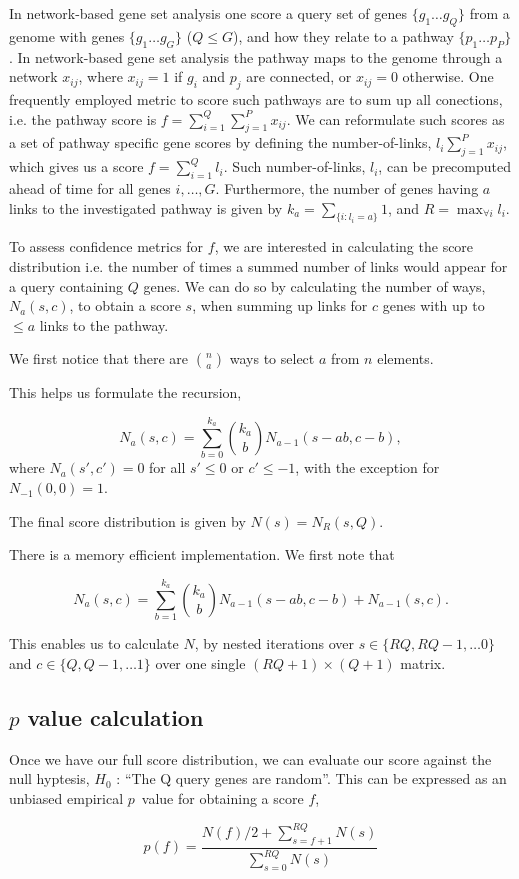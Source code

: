 \documentclass[11pt]{article}
\begin{document}
In network-based gene set analysis one score a query set of genes $ \{g_1 \ldots g_Q\} $ from a genome with genes $\{g_1 \ldots g_G\}$ ($Q \le G$), and how they relate to a pathway $\{p_1 \ldots p_P\}$. In network-based gene set analysis the pathway maps to the genome through a network ${x_{ij}}$, where $x_{ij}=1$ if $g_i$ and $p_j$ are connected, or $x_{ij}=0$ otherwise. One frequently employed metric to score such pathways are to sum up all conections, i.e. the pathway score is $f=\sum_{i=1}^Q\sum_{j=1}^P x_{ij}$.
We can reformulate such scores as a set of pathway specific gene scores by defining the number-of-links, $l_i\sum_{j=1}^P x_{ij}$, which gives us a score $f=\sum_{i=1}^Q l_i$.
Such number-of-links, $l_i$, can be precomputed ahead of time for all genes $i, \ldots, G$.
Furthermore, the number of genes having $a$ links to the investigated pathway is given by $k_a=\sum_{\{i:l_i=a\}}1$, and $R=\max_{\forall i}{l_i}$.

To assess confidence metrics for $f$, we are interested in calculating the score distribution i.e. the number of times a summed number of links would appear for a query containing $Q$ genes.
We can do so by calculating the number of ways, $N_a(s,c)$, to obtain a score $s$, when summing up links for $c$ genes with up to $\le a$ links to the pathway.

We first notice that there are $n\choose a$ ways to select $a$ from $n$ elements.

This helps us formulate the recursion,

\[
N_a(s,c)=\sum_{b=0}^{k_a}{k_a \choose b} N_{a-1}(s-ab,c-b),
\]
where $N_a(s',c')=0$ for all $s'\le 0$ or $c' \le -1$, with the exception for $N_{-1}(0,0)=1$.

The final score distribution is given by $N(s)=N_R(s,Q)$.

There is a memory efficient implementation. We first note that

\[
N_a(s,c)=\sum_{b=1}^{k_a}{k_a \choose b} N_{a-1}(s-ab,c-b) + N_{a-1}(s,c).
\]


This enables us to calculate $N$, by nested iterations over $s \in \{ RQ, RQ-1, \ldots 0 \}$ and $c \in \{ Q, Q-1, \ldots 1 \}$ over one single $(RQ+1) \times (Q+1)$ matrix.


\subsection*{$p$ value calculation}

Once we have our full score distribution, we can evaluate our score against the null hyptesis, $H_0$ : ``The Q query genes are random''. This can be expressed as an unbiased empirical $p$~value for obtaining a score $f$,

\[
p(f)=\frac{N(f)/2 +\sum_{s=f+1}^{RQ} N(s)}{\sum_{s=0}^{RQ} N(s)}
\]
\end{document}
